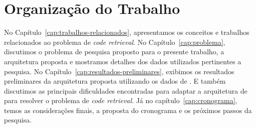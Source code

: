 \section{Organização do Trabalho}
\label{sec:organizacao_trabalho}

No Capítulo~\ref{cap:trabalhos-relacionados}, apresentamos os conceitos e trabalhos relacionados ao problema de \textit{code retrieval}. No Capítulo~\ref{cap:problema}, discutimos o problema de pesquisa proposto para o presente trabalho, a arquitetura proposta e mostramos detalhes dos dados utilizados pertinentes a pesquisa. 
No Capítulo~\ref{cap:resultados-preliminares}, exibimos os resultados preliminares da arquitetura proposta utilizando os dados de \cite{yao-2018}. E também discutimos as principais dificuldades encontradas para adaptar a arquitetura de \cite{tan-lstm-qa} para resolver o problema de \textit{code retrieval}. Já no capítulo~\ref{cap:cronograma}, temos as considerações finais, a proposta do cronograma e os próximos passos da pesquisa.